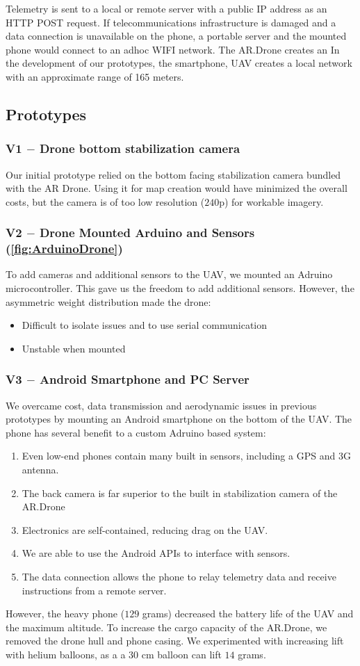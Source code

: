 Telemetry is sent to a local or remote server with a public IP address as an HTTP POST request. If telecommunications infrastructure is damaged and a data connection is unavailable on the phone, a portable server and the mounted phone would connect to an adhoc WIFI network.
The AR.Drone creates an In the development of our prototypes, the smartphone, UAV creates a local network with an approximate range of 165 meters.

\subsection{Prototypes}

\subsubsection{V1 $-$ Drone bottom stabilization camera}
Our initial prototype relied on the bottom facing stabilization camera bundled with the AR Drone. Using it for map creation would have minimized the overall costs, but the camera is of too low resolution ($240$p) for workable imagery.

\subsubsection{V2 $-$ Drone Mounted Arduino and Sensors (\autoref{fig:ArduinoDrone})}
To add cameras and additional sensors to the UAV, we mounted an Adruino microcontroller. This gave us the freedom to add additional sensors. However, the asymmetric weight distribution made the drone:
\begin{itemize}
	\item Difficult to isolate issues and to use serial communication
	\item Unstable when mounted
\end{itemize}

\subsubsection{V3 $-$ Android Smartphone and PC Server}
We overcame cost, data transmission and aerodynamic issues in previous prototypes by mounting an Android smartphone on the bottom of the UAV. The phone has several benefit to a custom Adruino based system:
\begin{enumerate}
	\item Even low-end phones contain many built in sensors, including a GPS and 3G antenna.
	\item The back camera is far superior to the built in stabilization camera of the AR.Drone
	\item Electronics are self-contained, reducing drag on the UAV.
	\item We are able to use the Android APIs to interface with sensors.
	\item The data connection allows the phone to relay telemetry data and receive instructions from a remote server.
\end{enumerate}

However, the heavy phone ($129$ grams) decreased the battery life of the UAV and the maximum altitude. To increase the cargo capacity of the AR.Drone, we removed the drone hull and phone casing. We experimented with increasing lift with helium balloons, as a a $30$ cm balloon can lift $14$ grams.
